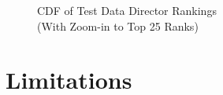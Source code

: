\documentclass{article} %
\begin{document}
\begin{figure}[h]
\begin{center}
\end{center}
\caption{CDF of Test Data Director Rankings \\ (With Zoom-in to Top 25 Ranks)}
\label{fig:cdf}
\end{figure}

\section{Limitations}
\end{document}
